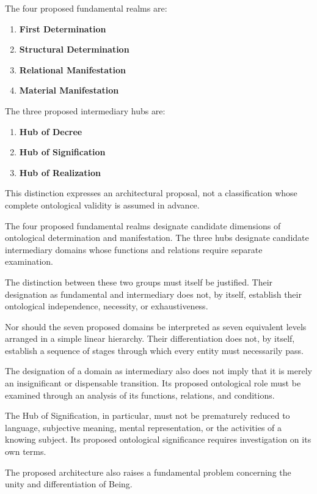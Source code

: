 The four proposed fundamental realms are:

\begin{enumerate}
    \item \textbf{First Determination}
    \item \textbf{Structural Determination}
    \item \textbf{Relational Manifestation}
    \item \textbf{Material Manifestation}
\end{enumerate}

The three proposed intermediary hubs are:

\begin{enumerate}
    \item \textbf{Hub of Decree}
    \item \textbf{Hub of Signification}
    \item \textbf{Hub of Realization}
\end{enumerate}

This distinction expresses an architectural proposal,
not a classification whose complete ontological
validity is assumed in advance.

The four proposed fundamental realms designate
candidate dimensions of ontological determination
and manifestation. The three hubs designate
candidate intermediary domains whose functions
and relations require separate examination.

The distinction between these two groups must
itself be justified. Their designation as fundamental
and intermediary does not, by itself, establish
their ontological independence, necessity, or
exhaustiveness.

Nor should the seven proposed domains be interpreted
as seven equivalent levels arranged in a simple
linear hierarchy. Their differentiation does not,
by itself, establish a sequence of stages through
which every entity must necessarily pass.

The designation of a domain as intermediary also
does not imply that it is merely an insignificant
or dispensable transition. Its proposed ontological
role must be examined through an analysis of
its functions, relations, and conditions.

The Hub of Signification, in particular, must not
be prematurely reduced to language, subjective
meaning, mental representation, or the activities
of a knowing subject. Its proposed ontological
significance requires investigation on its own terms.

The proposed architecture also raises a fundamental
problem concerning the unity and differentiation
of Being.

